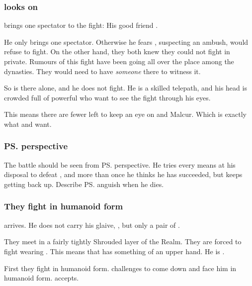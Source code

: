 \begin{garbage}
\subsubsection{\Menessiaraid{} looks on}
\Teshrial{} brings one spectator to the fight: 
His good friend \Menessiaraid. 

He only brings one spectator. 
Otherwise he fears \Ishnaruchaefir, suspecting an ambush, would refuse to fight. 
On the other hand, they both knew they could not fight in private. 
Rumours of this fight have been going all over the place among the dynasties. 
They would need to have \emph{someone} there to witness it. 

So \Menessiaraid{} is there alone, and he does not fight. 
He is a skilled telepath, and his head is crowded full of powerful \resphain{} who want to see the fight through his eyes. 

This means there are fewer \resphain{} left to keep an eye on \Forklin{} and Malcur. 
Which is exactly what \Ishnaruchaefir{} and \Secherdamon{} want. 





\subsubsection{\ps{\Teshrial} perspective}
The battle should be seen from \ps{\Teshrial} perspective. 
He tries every means at his disposal to defeat \Ishnaruchaefir, and more than once he thinks he has succeeded, but \Ishnaruchaefir{} keeps getting back up. 
Describe \ps{\Teshrial} anguish when he dies. 





\subsubsection{They fight in humanoid form}
\Ishnaruchaefir{} arrives. 
He does not carry his glaive, \Rystessakhin, but only a pair of \skekrathuins. 

They meet in a fairly tightly Shrouded layer of the Realm. 
They are forced to fight wearing . 
This means that \Teshrial{} has something of an upper hand. 
He is . 

First they fight in humanoid form. 
\Teshrial{} challenges \Ishnaruchaefir{} to come down and face him in humanoid form. 
\Ishnaruchaefir{} accepts. 


\end{garbage}

